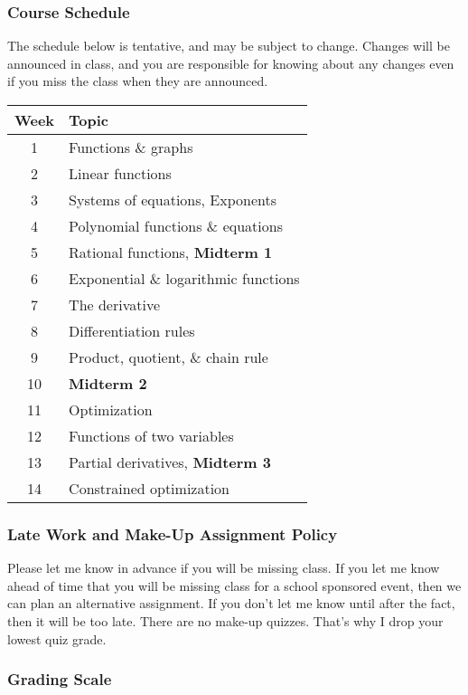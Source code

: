 \documentclass[10pt]{article}
\begin{document}
\subsubsection*{Course Schedule} 

The schedule below is tentative, and may be subject to change. Changes will be announced in class, and you are responsible for knowing about any changes even if you miss the class when they are announced.


\begin{center}
\begin{tabular}{|c|l|}
\hline
Week & Topic \\ \hline
1  & Functions \& graphs  \\ 
2  & Linear functions  \\ 
3  & Systems of equations, Exponents  \\ 
4  & Polynomial functions \& equations  \\ 
5  & Rational functions, \textbf{Midterm 1} \\ 
6  & Exponential \& logarithmic functions  \\ 
7  & The derivative  \\ 
8  & Differentiation rules  \\ 
9  & Product, quotient, \& chain rule  \\ 
10  & \textbf{Midterm 2} \\ 
11  & Optimization  \\ 
12  & Functions of two variables  \\ 
13  & Partial derivatives, \textbf{Midterm 3}  \\ 
14  & Constrained optimization  \\ \hline
\end{tabular}
\end{center}

\subsubsection*{Late Work and Make-Up Assignment Policy}

Please let me know in advance if you will be missing class. If you let me know ahead of time that you will be missing class for a school sponsored event, then we can plan an alternative assignment. If you don't let me know until after the fact, then it will be too late.  There are no make-up quizzes.  That's why I drop your lowest quiz grade. 

\subsubsection*{Grading Scale} 
\end{document}
